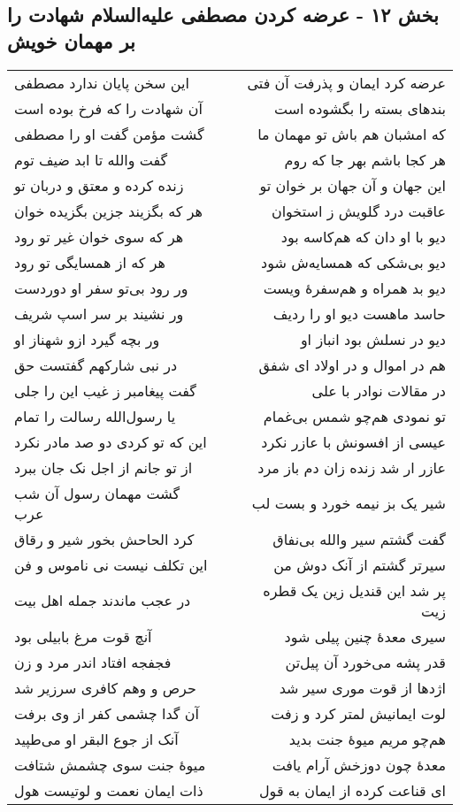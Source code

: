 \begin{center}
\section*{بخش ۱۲ - عرضه کردن مصطفی علیه‌السلام شهادت را بر مهمان خویش}
\label{sec:sh012}
\begin{longtable}{l p{0.5cm} r}
این سخن پایان ندارد مصطفی
&&
عرضه کرد ایمان و پذرفت آن فتی
\\
آن شهادت را که فرخ بوده است
&&
بندهای بسته را بگشوده است
\\
گشت مؤمن گفت او را مصطفی
&&
که امشبان هم باش تو مهمان ما
\\
گفت والله تا ابد ضیف توم
&&
هر کجا باشم بهر جا که روم
\\
زنده کرده و معتق و دربان تو
&&
این جهان و آن جهان بر خوان تو
\\
هر که بگزیند جزین بگزیده خوان
&&
عاقبت درد گلویش ز استخوان
\\
هر که سوی خوان غیر تو رود
&&
دیو با او دان که هم‌کاسه بود
\\
هر که از همسایگی تو رود
&&
دیو بی‌شکی که همسایه‌ش شود
\\
ور رود بی‌تو سفر او دوردست
&&
دیو بد همراه و هم‌سفرهٔ ویست
\\
ور نشیند بر سر اسپ شریف
&&
حاسد ماهست دیو او را ردیف
\\
ور بچه گیرد ازو شهناز او
&&
دیو در نسلش بود انباز او
\\
در نبی شارکهم گفتست حق
&&
هم در اموال و در اولاد ای شفق
\\
گفت پیغامبر ز غیب این را جلی
&&
در مقالات نوادر با علی
\\
یا رسول‌الله رسالت را تمام
&&
تو نمودی هم‌چو شمس بی‌غمام
\\
این که تو کردی دو صد مادر نکرد
&&
عیسی از افسونش با عازر نکرد
\\
از تو جانم از اجل نک جان ببرد
&&
عازر ار شد زنده زان دم باز مرد
\\
گشت مهمان رسول آن شب عرب
&&
شیر یک بز نیمه خورد و بست لب
\\
کرد الحاحش بخور شیر و رقاق
&&
گفت گشتم سیر والله بی‌نفاق
\\
این تکلف نیست نی ناموس و فن
&&
سیرتر گشتم از آنک دوش من
\\
در عجب ماندند جمله اهل بیت
&&
پر شد این قندیل زین یک قطره زیت
\\
آنچ قوت مرغ بابیلی بود
&&
سیری معدهٔ چنین پیلی شود
\\
فجفجه افتاد اندر مرد و زن
&&
قدر پشه می‌خورد آن پیل‌تن
\\
حرص و وهم کافری سرزیر شد
&&
اژدها از قوت موری سیر شد
\\
آن گدا چشمی کفر از وی برفت
&&
لوت ایمانیش لمتر کرد و زفت
\\
آنک از جوع البقر او می‌طپید
&&
هم‌چو مریم میوهٔ جنت بدید
\\
میوهٔ جنت سوی چشمش شتافت
&&
معدهٔ چون دوزخش آرام یافت
\\
ذات ایمان نعمت و لوتیست هول
&&
ای قناعت کرده از ایمان به قول
\\
\end{longtable}
\end{center}
